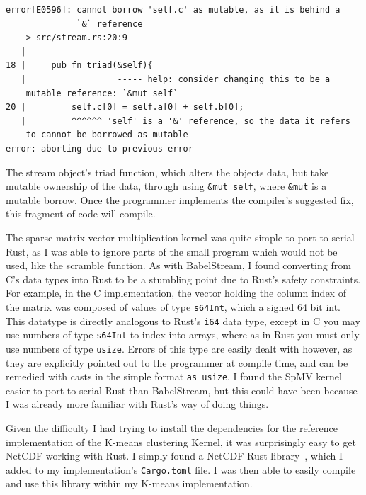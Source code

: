 \begin{code}
\begin{verbatim}
error[E0596]: cannot borrow 'self.c' as mutable, as it is behind a
              `&` reference
  --> src/stream.rs:20:9
   |
18 |     pub fn triad(&self){
   |                  ----- help: consider changing this to be a
    mutable reference: `&mut self`
20 |         self.c[0] = self.a[0] + self.b[0];
   |         ^^^^^^ 'self' is a '&' reference, so the data it refers
    to cannot be borrowed as mutable
error: aborting due to previous error
\end{verbatim}
\label{lst:rustc-borrow}
\end{code}

The stream object's triad function, which alters the objects data, but take mutable ownership of the data, through using \texttt{\&mut self}, where \texttt{\&mut} is a mutable borrow. Once the programmer implements the compiler's suggested fix, this fragment of code will compile.

The sparse matrix vector multiplication kernel was quite simple to port to serial Rust, as I was able to ignore parts of the small program which would not be used, like the scramble function. As with BabelStream, I found converting from C's data types into Rust to be a stumbling point due to Rust's safety constraints.
For example, in the C implementation, the vector holding the column index of the matrix was composed of values of type \texttt{s64Int}, which a signed 64 bit int. This datatype is directly analogous to Rust's \texttt{i64} data type, except in C you may use numbers of type \texttt{s64Int} to index into arrays, where as in Rust you must only use numbers of type \texttt{usize}. Errors of this type are easily dealt with however, as they are explicitly pointed out to the programmer at compile time, and can be remedied with casts in the simple format \texttt{as usize}. I found the SpMV kernel easier to port to serial Rust than BabelStream, but this could have been because I was already more familiar with Rust's way of doing things.

Given the difficulty I had trying to install the dependencies for the reference implementation of the K-means clustering Kernel, it was surprisingly easy to get NetCDF working with Rust. I simply found a NetCDF Rust library~\cite{RustNetCDF}, which I added to my implementation's \texttt{Cargo.toml} file. I was then able to easily compile and use this library within my K-means implementation.

